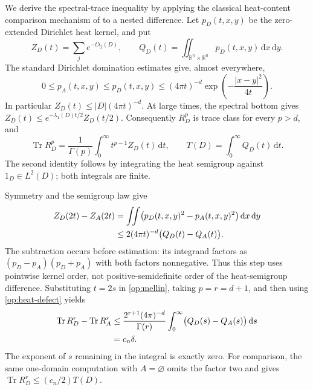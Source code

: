 \documentclass[11pt,reqno]{amsart}
\numberwithin{equation}{section}
\newcommand{\R}{\mathbb R}
\newcommand{\dd}{\,\mathrm d}
\newcommand{\abs}[1]{\lvert#1\rvert}
\DeclareMathOperator{\Tr}{Tr}
\begin{document}
We derive the spectral-trace inequality by applying the classical
heat-content comparison mechanism of
\cite[Lemma~2.6]{vanDenBergDavies1989} to a nested difference.
Let $p_D(t,x,y)$ be the zero-extended Dirichlet heat kernel, and put
\[
 Z_D(t)=\sum_j e^{-t\lambda_j(D)},\qquad
 Q_D(t)=\iint_{\R^n\times\R^n}p_D(t,x,y)\dd x\dd y.
\]
The standard Dirichlet domination estimates
\cite{Davies1989} give, almost everywhere,
\begin{equation}\label{op:heat-domination}
 0\le p_A(t,x,y)\le p_D(t,x,y)
 \le(4\pi t)^{-d}\exp\left(-\frac{\abs{x-y}^2}{4t}\right).
\end{equation}
In particular $Z_D(t)\le\abs D(4\pi t)^{-d}$.  At large
times, the spectral bottom gives
$Z_D(t)\le e^{-\lambda_1(D)t/2}Z_D(t/2)$.
Consequently $R_D^p$ is trace class for every $p>d$, and
\begin{equation}\label{op:mellin}
 \Tr R_D^p=\frac1{\Gamma(p)}
       \int_0^\infty t^{p-1}Z_D(t)\dd t,
 \qquad
 T(D)=\int_0^\infty Q_D(t)\dd t.
\end{equation}
The second identity follows by integrating the heat semigroup against
$1_D\in L^2(D)$; both integrals are finite.

Symmetry and the semigroup law give
\begin{align}
 Z_D(2t)-Z_A(2t)
 &=\iint\bigl(p_D(t,x,y)^2-p_A(t,x,y)^2\bigr)\dd x\dd y
 \notag\\
 &\le2(4\pi t)^{-d}\bigl(Q_D(t)-Q_A(t)\bigr).
 \label{op:heat-defect}
\end{align}
The subtraction occurs before estimation: its integrand factors as
$(p_D-p_A)(p_D+p_A)$ with both factors nonnegative.  Thus this
step uses pointwise kernel order, not positive-semidefinite order of
the heat-semigroup difference.  Substituting $t=2s$ in
\eqref{op:mellin}, taking $p=r=d+1$, and then using
\eqref{op:heat-defect} yields
\begin{align}
 \Tr R_D^r-\Tr R_A^r
 &\le\frac{2^{r+1}(4\pi)^{-d}}{\Gamma(r)}
       \int_0^\infty\bigl(Q_D(s)-Q_A(s)\bigr)\dd s
 \notag\\
 &=c_n\delta.
 \label{op:critical-trace}
\end{align}
The exponent of $s$ remaining in the integral is exactly zero.
For comparison, the same one-domain computation with $A=\varnothing$
omits the factor two and gives
$\Tr R_D^r\le(c_n/2)T(D)$.
\end{document}

